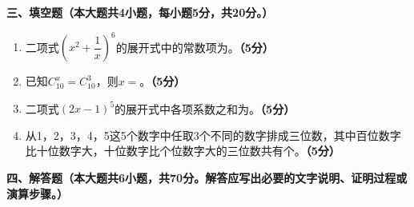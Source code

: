 \documentclass[12pt, a4paper]{ctexart}
\newcommand{\score}[1]{\hfill\textbf{（#1分）}}
\begin{document}
\noindent\textbf{三、填空题（本大题共4小题，每小题5分，共20分。）}

\vspace{0.3cm}

\begin{enumerate}[label=\textbf{\arabic*.}, leftmargin=2em, resume]

\item 二项式$\left(x^2+\dfrac{1}{x}\right)^6$的展开式中的常数项为\hspace{3cm}。\score{5}

\item 已知$C_{10}^x = C_{10}^3$，则$x=$\hspace{3cm}。\score{5}

\item 二项式$(2x-1)^5$的展开式中各项系数之和为\hspace{3cm}。\score{5}

\item 从1，2，3，4，5这5个数字中任取3个不同的数字排成三位数，其中百位数字比十位数字大，十位数字比个位数字大的三位数共有\hspace{3cm}个。\score{5}

\end{enumerate}

\newpage

\noindent\textbf{四、解答题（本大题共6小题，共70分。解答应写出必要的文字说明、证明过程或演算步骤。）}

\vspace{0.3cm}
\end{document}
